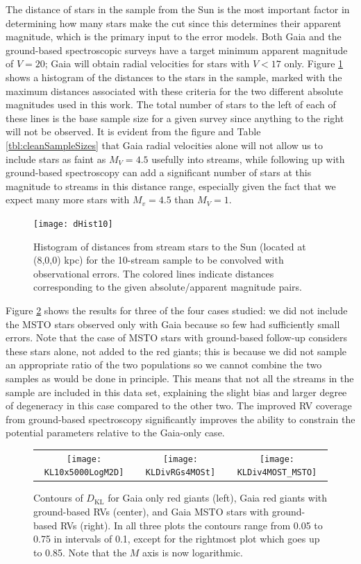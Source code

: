 \documentclass[useAMS,usenatbib,a4paper]{mn2e}
\newcommand{\sub}[2]{\ensuremath{#1_{\mathrm{#2}}}}
\begin{document}
The distance of stars in the sample from the Sun is the most important factor in determining how many stars make the cut since this determines their apparent magnitude, which is the primary input to the error models. Both Gaia and the ground-based spectroscopic surveys have a target minimum apparent magnitude of $V=20$; Gaia will obtain radial velocities for stars with $V<17$ only. Figure \ref{fig:distanceHistogram} shows a histogram of the distances to the stars in the sample, marked with the maximum distances associated with these criteria for the two different absolute magnitudes used in this work. The total number of stars to the left of each of these lines is the base sample size for a given survey since anything to the right will not be observed. It is evident from the figure and Table \ref{tbl:cleanSampleSizes} that Gaia radial velocities alone will not allow us to include stars as faint as $M_V=4.5$ usefully into streams, while following up with ground-based spectroscopy can add a significant number of stars at this magnitude to streams in this distance range, especially given the fact that we expect many more stars with $M_v=4.5$ than  $M_V=1$. 

\begin{figure}
 \texttt{[image: dHist10]}
\caption{Histogram of distances from stream stars to the Sun (located at (8,0,0) kpc) for the 10-stream sample to be convolved with observational errors. The colored lines indicate distances corresponding to the given absolute/apparent magnitude pairs.}
\label{fig:distanceHistogram}
\end{figure}



Figure \ref{fig:errorConvResults} shows the results for three of the four cases studied: we did not include the MSTO stars observed only with Gaia because so few had sufficiently small errors. Note that the case of MSTO stars with ground-based follow-up considers these stars alone, not added to the red giants; this is because we did not sample an appropriate ratio of the two populations so we cannot combine the two samples as would be done in principle. This means that not all the streams in the sample are included in this data set, explaining the slight bias and larger degree of degeneracy in this case compared to the other two. The improved RV coverage from ground-based spectroscopy significantly improves the ability to constrain the potential parameters relative to the Gaia-only case. 

\begin{figure}
 \begin{tabular}{ccc}
\texttt{[image: KL10x5000LogM2D]} & \texttt{[image: KLDivRGs4MOSt]} & \texttt{[image: KLDiv4MOST\_MSTO]}
\end{tabular}
\caption{Contours of $\sub{D}{KL}$ for Gaia only red giants (left), Gaia red giants with ground-based RVs (center), and Gaia MSTO stars with ground-based RVs (right). In all three plots the contours range from 0.05 to 0.75 in intervals of 0.1, except for the rightmost plot which goes up to 0.85. Note that the $M$ axis is now logarithmic.}
\label{fig:errorConvResults}
\end{figure}
\end{document}
